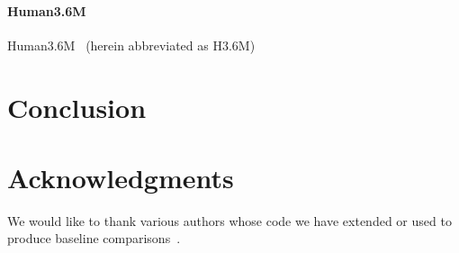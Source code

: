 \documentclass[runningheads]{llncs}
\begin{document}

\paragraph{Human3.6M} Human3.6M~\cite{ionescu2014human,ionescu2011latent} (herein abbreviated as H3.6M)



\section{Conclusion}

\section*{Acknowledgments}

We would like to thank various authors whose code we have extended or used to
produce baseline
comparisons~\cite{pfister2015flowing,chen2014articulated,cherian2014mixing}.





\end{document}
